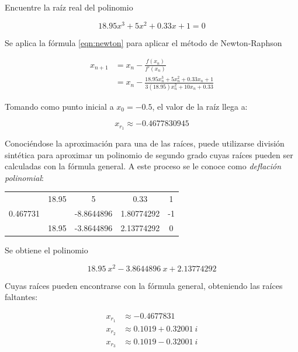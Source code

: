 \begin{ex}
    Encuentre la raíz real del polinomio 

    \[
        18.95x^3 + 5x^2  + 0.33x + 1 = 0
    \]

    \begin{solution}
        Se aplica la fórmula \ref{eqn:newton} para aplicar el método de
        Newton-Raphson

        \begin{align*}
            x_{n+1} &= x_n - \frac{f(x_n)}{f'(x_n)} \\
                &= x_n - \frac{18.95x_n^3 + 5x_n^2 + 0.33x_n +
                1}{3(18.95)x_n^2 + 10x_n + 0.33}
        \end{align*}

        Tomando como punto inicial a \(x_0 = -0.5 \), el valor de la raíz
        llega a:

        \[
            \boxed{x_{r_1} \approx -0.4677830945}
        \]

        Conociéndose la aproximación para una de las raíces, puede utilizarse
        división sintética para aproximar un polinomio de segundo grado cuyas
        raíces pueden ser calculadas con la fórmula general. A este proceso se
        le conoce como \textit{deflación polinomial}:

        \begin{center}
            \begin{tabular}{ c | c c c c }
                & 18.95 & 5 & 0.33 & 1 \\
                    0.467731 & & -8.8644896 & 1.80774292 & -1 \\
             \hline
                 & 18.95 & -3.8644896 & 2.13774292 & 0
            \end{tabular}
        \end{center}

        Se obtiene el polinomio 

        \[
            18.95\ x^2 - 3.8644896\ x + 2.13774292
        \]
    
        Cuyas raíces pueden encontrarse con la fórmula general, obteniendo las
        raíces faltantes:

        \begin{align*}
            x_{r_1} & \approx -0.4677831 \\
            x_{r_2} & \approx 0.1019 + 0.32001\ i \\
            x_{r_3} & \approx 0.1019 - 0.32001\ i 
        \end{align*}
    \end{solution}

\end{ex}

